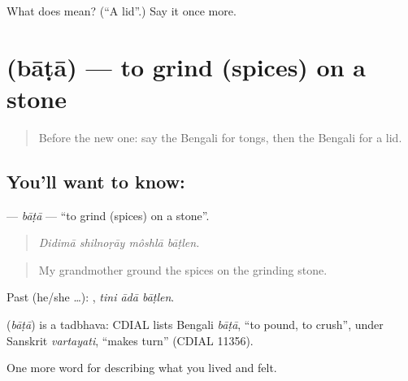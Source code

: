 \begin{tcolorbox}[breakable,colback=teal!4,colframe=teal!35!black,title={Before you move on}]
What does  mean? (\textquotedblleft{}A lid\textquotedblright{}.) Say it once more.
\end{tcolorbox}
\section[\texorpdfstring{\bn{বাটা} (bāṭā)}{বাটা (bāṭā)}]{ (bāṭā) — to grind (spices) on a stone}

\label{lesson:BN-C512-bata}



\begin{quote}
Before the new one: say the Bengali for tongs, then the Bengali for a lid.
\end{quote}

\subsection*{You'll want to know: }
\textbf{} — \emph{bāṭā} — \textquotedblleft{}to grind (spices) on a stone\textquotedblright{}.

\begin{quote}
   
\end{quote}

\begin{quote}
\emph{Didimā shilnoṛāy môshlā bāṭlen.}
\end{quote}

\begin{quote}
My grandmother ground the spices on the grinding stone.
\end{quote}

Past (he/she …):   , \emph{tini ādā bāṭlen}.

\begin{cousinweb}
\textbf{} (\emph{bāṭā}) is a tadbhava: CDIAL lists Bengali \emph{bāṭā}, \textquotedblleft{}to pound, to crush\textquotedblright{}, under Sanskrit \emph{vartayati}, \textquotedblleft{}makes turn\textquotedblright{} (CDIAL 11356).
\end{cousinweb}

\begin{grammarlens}[title={What you've built}]
One more word for describing what you lived and felt.
\end{grammarlens}

